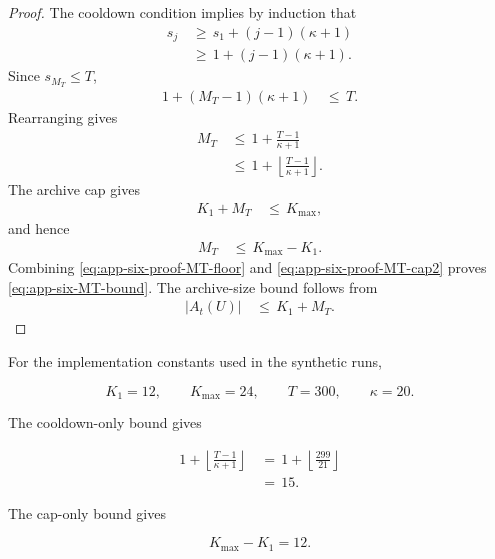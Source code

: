 \documentclass{article} %
\begin{document}
\begin{proof}
The cooldown condition implies by induction that
\begin{align}
\label{eq:app-six-proof-sj-lower}
s_j
&\,\ge\,
s_1+(j-1)(\kappa+1)
\\
&\,\ge\,
1+(j-1)(\kappa+1).
\end{align}
Since \(s_{M_T}\le T\),
\begin{align}
\label{eq:app-six-proof-MT-cooldown}
1+(M_T-1)(\kappa+1)
&\,\le\,
T.
\end{align}
Rearranging gives
\begin{align}
\label{eq:app-six-proof-MT-floor}
M_T
&\,\le\,
1+\frac{T-1}{\kappa+1}
\\
&\,\le\,
1+\left\lfloor\frac{T-1}{\kappa+1}\right\rfloor.
\end{align}
The archive cap gives
\begin{align}
\label{eq:app-six-proof-MT-cap}
K_1+M_T
&\,\le\,
K_{\max},
\end{align}
and hence
\begin{align}
\label{eq:app-six-proof-MT-cap2}
M_T
&\,\le\,
K_{\max}-K_1.
\end{align}
Combining \eqref{eq:app-six-proof-MT-floor} and \eqref{eq:app-six-proof-MT-cap2} proves \eqref{eq:app-six-MT-bound}.  The archive-size bound follows from
\begin{align}
\label{eq:app-six-proof-size-final}
|A_t(U)|
&\,\le\,
K_1+M_T.
\end{align}
\end{proof}

For the implementation constants used in the synthetic runs,

\begin{equation}
\label{eq:app-six-cooldown-example-constants}
K_1=12,
\qquad
K_{\max}=24,
\qquad
T=300,
\qquad
\kappa=20.
\end{equation}

The cooldown-only bound gives

\begin{align}
\label{eq:app-six-cooldown-example-cool}
1+\left\lfloor\frac{T-1}{\kappa+1}\right\rfloor
&\,=\,
1+\left\lfloor\frac{299}{21}\right\rfloor
\\
&\,=\,
15.
\end{align}

The cap-only bound gives

\begin{equation}
\label{eq:app-six-cooldown-example-cap}
K_{\max}-K_1=12.
\end{equation}
\end{document}
